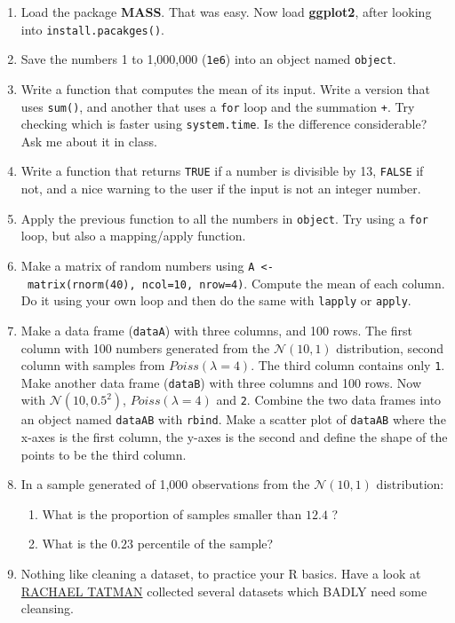 \documentclass[]{book}
\providecommand{\tightlist}{%
  \setlength{\itemsep}{0pt}\setlength{\parskip}{0pt}}
\theoremstyle{definition}
\theoremstyle{definition}
\theoremstyle{definition}
\theoremstyle{remark}
\begin{document}
\begin{enumerate}
\def\labelenumi{\arabic{enumi}.}
\item
  Load the package \textbf{MASS}. That was easy. Now load
  \textbf{ggplot2}, after looking into \texttt{install.pacakges()}.
\item
  Save the numbers 1 to 1,000,000 (\texttt{1e6}) into an object named
  \texttt{object}.
\item
  Write a function that computes the mean of its input. Write a version
  that uses \texttt{sum()}, and another that uses a \texttt{for} loop
  and the summation \texttt{+}. Try checking which is faster using
  \texttt{system.time}. Is the difference considerable? Ask me about it
  in class.
\item
  Write a function that returns \texttt{TRUE} if a number is divisible
  by 13, \texttt{FALSE} if not, and a nice warning to the user if the
  input is not an integer number.
\item
  Apply the previous function to all the numbers in \texttt{object}. Try
  using a \texttt{for} loop, but also a mapping/apply function.
\item
  Make a matrix of random numbers using
  \texttt{A\ \textless{}-\ matrix(rnorm(40),\ ncol=10,\ nrow=4)}.
  Compute the mean of each column. Do it using your own loop and then do
  the same with \texttt{lapply} or \texttt{apply}.
\item
  Make a data frame (\texttt{dataA}) with three columns, and 100 rows.
  The first column with 100 numbers generated from the
  \(\mathcal{N}(10,1)\) distribution, second column with samples from
  \(Poiss(\lambda=4)\). The third column contains only \texttt{1}.\\
  Make another data frame (\texttt{dataB}) with three columns and 100
  rows. Now with \(\mathcal{N}(10,0.5^2)\), \(Poiss(\lambda=4)\) and
  \texttt{2}. Combine the two data frames into an object named
  \texttt{dataAB} with \texttt{rbind}. Make a scatter plot of
  \texttt{dataAB} where the x-axes is the first column, the y-axes is
  the second and define the shape of the points to be the third column.
\item
  In a sample generated of 1,000 observations from the
  \(\mathcal{N}(10,1)\) distribution:

  \begin{enumerate}
  \def\labelenumii{\arabic{enumii}.}
  \tightlist
  \item
    What is the proportion of samples smaller than \(12.4\) ?
  \item
    What is the \(0.23\) percentile of the sample?
  \end{enumerate}
\item
  Nothing like cleaning a dataset, to practice your R basics. Have a
  look at
  \href{https://makingnoiseandhearingthings.com/2018/04/19/datasets-for-data-cleaning-practice/}{RACHAEL
  TATMAN} collected several datasets which BADLY need some cleansing.
\end{enumerate}
\end{document}
